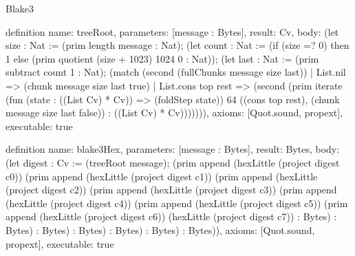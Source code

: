 \begin{lexlean}{Blake3}
\begin{semanticmodule}
definition{
  name: treeRoot,
  parameters: [message : Bytes],
  result: Cv,
  body: (let size : Nat := (prim length message : Nat); (let count : Nat := (if (size =? 0) then 1 else (prim quotient (size + 1023) 1024 0 : Nat)); (let last : Nat := (prim subtract count 1 : Nat); (match (second (fullChunks message size last))
    | List.nil => (chunk message size last true)
    | List.cons top rest => (second (prim iterate (fun (state : ((List Cv) * Cv)) => (foldStep state)) 64 ((cons top rest), (chunk message size last false)) : ((List Cv) * Cv))))))),
  axioms: [Quot.sound, propext],
  executable: true
}

definition{
  name: blake3Hex,
  parameters: [message : Bytes],
  result: Bytes,
  body: (let digest : Cv := (treeRoot message); (prim append (hexLittle (project digest c0)) (prim append (hexLittle (project digest c1)) (prim append (hexLittle (project digest c2)) (prim append (hexLittle (project digest c3)) (prim append (hexLittle (project digest c4)) (prim append (hexLittle (project digest c5)) (prim append (hexLittle (project digest c6)) (hexLittle (project digest c7)) : Bytes) : Bytes) : Bytes) : Bytes) : Bytes) : Bytes) : Bytes)),
  axioms: [Quot.sound, propext],
  executable: true
}
\end{semanticmodule}
\end{lexlean}
